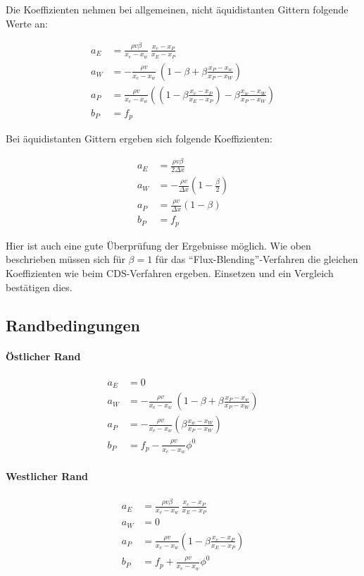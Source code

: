 \documentclass[10pt, ngerman,colorback,accentcolor=tud2d]{tudreport}
\begin{document}
Die Koeffizienten nehmen bei allgemeinen, nicht äquidistanten Gittern folgende Werte
an:

\begin{align*}
  a_E &= \frac{\rho v \beta}{x_e-x_w}\ \frac{x_e-x_P}{x_E-x_P}\\
  a_W &=-\frac{\rho v}{x_e-x_w}\ \left({1-\beta + \beta \frac{x_P-x_w}{x_P-x_W}}\right)\\
  a_P &= \frac{\rho v}{x_e-x_w} \left({
  \left({1-\beta \frac{x_e-x_P}{x_E-x_P}}\right)- \beta \frac{x_w-x_W}{x_P-x_W}
  }\right)\\
  b_P &= f_p
\end{align*}

Bei äquidistanten Gittern ergeben sich folgende Koeffizienten:

\begin{align*}
  a_E &= \frac{\rho v \beta}{2\Delta x}\\
  a_W &=-\frac{\rho v}{\Delta x}\left({1-\frac{\beta}{2} }\right)\\
  a_P &= \frac{\rho v}{\Delta x}(1-\beta)\\
  b_P &= f_p
\end{align*}

Hier ist auch eine gute Überprüfung der Ergebnisse möglich. Wie oben beschrieben
müssen sich für $\beta = 1$ für das ``Flux-Blending''-Verfahren die gleichen
Koeffizienten wie beim CDS-Verfahren ergeben. Einsetzen und ein Vergleich bestätigen dies.

\subsection{Randbedingungen}

\paragraph{Östlicher Rand}

\begin{align*}
  a_E &= 0\\
  a_W &=-\frac{\rho v}{x_e-x_w}\ \left({1-\beta + \beta \frac{x_P-x_w}{x_P-x_W}}\right)\\
  a_P &=-\frac{\rho v}{x_e-x_w} \left({\beta \frac{x_w-x_W}{x_P-x_W}}\right)\\
  b_P &= f_p-\frac{\rho v}{x_e-x_w} \phi^0
\end{align*}


\paragraph{Westlicher Rand}

\begin{align*}
  a_E &= \frac{\rho v \beta}{x_e-x_w}\ \frac{x_e-x_P}{x_E-x_P}\\
  a_W &=0\\
  a_P &= \frac{\rho v}{x_e-x_w} \left({1-\beta \frac{x_e-x_P}{x_E-x_P}}\right)\\
  b_P &= f_p+\frac{\rho v}{x_e-x_w} \phi^0
\end{align*}
\end{document}
